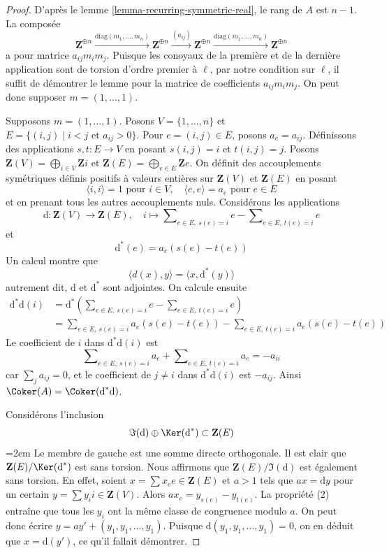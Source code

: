 \begin{proof}
D'après le lemme \ref{lemma-recurring-symmetric-real}, le rang de $A$ est $n - 1$.
La composée
$$
\mathbf{Z}^{\oplus n} \xrightarrow{\text{diag}(m_1, \ldots, m_n)}
\mathbf{Z}^{\oplus n} \xrightarrow{(a_{ij})}
\mathbf{Z}^{\oplus n} \xrightarrow{\text{diag}(m_1, \ldots, m_n)}
\mathbf{Z}^{\oplus n}
$$
a pour matrice $a_{ij}m_im_j$. Puisque les conoyaux de la première et de la dernière
application sont de torsion d'ordre premier à $\ell$, par notre condition sur $\ell$,
il suffit de démontrer le lemme pour la matrice
de coefficients $a_{ij}m_im_j$. On peut donc supposer $m = (1, \ldots, 1)$.

\medskip\noindent
Supposons $m = (1, \ldots, 1)$. Posons $V = \{1, \ldots, n\}$ et
$E = \{(i, j) \mid i < j\text{ et }a_{ij} > 0\}$. Pour
$e = (i, j) \in E$, posons $a_e = a_{ij}$. Définissons des applications
$s, t : E \to V$ en posant $s(i, j) = i$ et $t(i, j) = j$.
Posons
$\mathbf{Z}(V) = \bigoplus_{i \in V} \mathbf{Z}i$ et
$\mathbf{Z}(E) = \bigoplus_{e \in E} \mathbf{Z}e$.
On définit des accouplements symétriques définis positifs à valeurs entières
sur $\mathbf{Z}(V)$ et $\mathbf{Z}(E)$ en posant
$$
\langle i, i \rangle = 1\text{ pour }i \in V, \quad
\langle e, e \rangle = a_e\text{ pour }e \in E
$$
et en prenant tous les autres accouplements nuls. Considérons les applications
$$
\text{d} : \mathbf{Z}(V) \to \mathbf{Z}(E), \quad
i \longmapsto
\sum\nolimits_{e \in E,\ s(e) = i} e - \sum\nolimits_{e \in E,\ t(e) = i} e
$$
et
$$
\text{d}^*(e) = a_e(s(e) - t(e))
$$
Un calcul montre que
$$
\langle d(x), y\rangle = \langle x, \text{d}^*(y) \rangle
$$
autrement dit, $\text{d}$ et $\text{d}^*$ sont adjointes. On calcule ensuite
\begin{align*}
\text{d}^*\text{d}(i)
& = 
\text{d}^*(
\sum\nolimits_{e \in E,\ s(e) = i} e - \sum\nolimits_{e \in E,\ t(e) = i} e) \\
& =
\sum\nolimits_{e \in E,\ s(e) = i} a_e(s(e) - t(e)) -
\sum\nolimits_{e \in E,\ t(e) = i} a_e(s(e) - t(e))
\end{align*}
Le coefficient de $i$ dans $\text{d}^*\text{d}(i)$ est
$$
\sum\nolimits_{e \in E,\ s(e) = i} a_e +
\sum\nolimits_{e \in E,\ t(e) = i} a_e = - a_{ii}
$$
car $\sum_j a_{ij} = 0$, et le coefficient de
$j \not = i$ dans $\text{d}^*\text{d}(i)$ est $-a_{ij}$.
Ainsi $\Coker(A) = \Coker(\text{d}^*\text{d})$.

\medskip\noindent
Considérons l'inclusion
$$
\Im(\text{d}) \oplus \Ker(\text{d}^*) \subset \mathbf{Z}(E)
$$
\begingroup
\emergencystretch=2em
Le membre de gauche est une somme directe orthogonale. Il est clair que
$\mathbf{Z}(E)/\Ker(\text{d}^*)$ est sans torsion.
Nous affirmons que $\mathbf{Z}(E)/\Im(\text{d})$ est également sans torsion.
En effet, soient $x = \sum x_e e \in \mathbf{Z}(E)$ et $a > 1$ tels
que $ax = \text{d}y$ pour un certain $y = \sum y_i i \in \mathbf{Z}(V)$.
Alors $a x_e = y_{s(e)} - y_{t(e)}$. La propriété (2) entraîne
que tous les $y_i$ ont la même classe de congruence modulo $a$.
On peut donc écrire $y = a y' + (y_1, y_1, \ldots, y_1)$.
Puisque $\text{d}(y_1, y_1, \ldots, y_1) = 0$, on en déduit
que $x = \text{d}(y')$, ce qu'il fallait démontrer.
\par
\endgroup


\end{proof}
